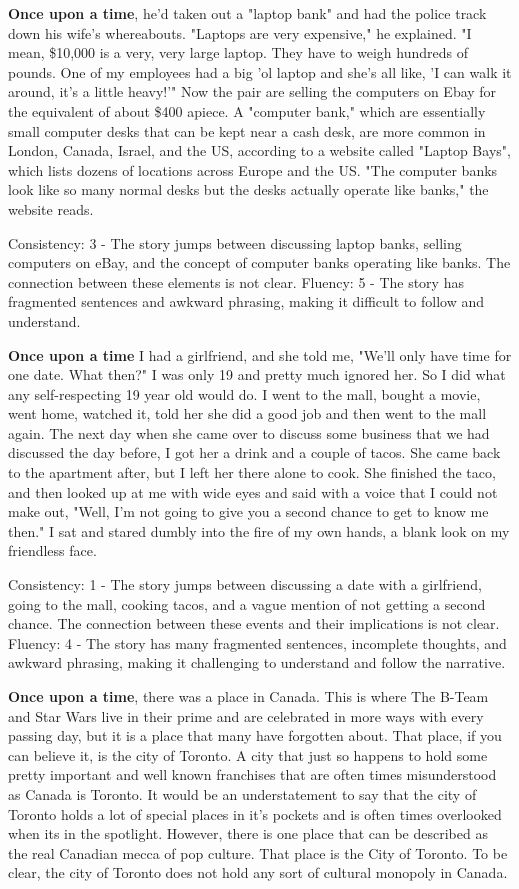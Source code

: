 \documentclass{article}
\begin{document}
\textbf{Once upon a time}, he'd taken out a "laptop bank" and had the police track down his wife's whereabouts. "Laptops are very expensive," he explained. "I mean, \$10,000 is a very, very large laptop. They have to weigh hundreds of pounds. One of my employees had a big 'ol laptop and she's all like, 'I can walk it around, it's a little heavy!'" Now the pair are selling the computers on Ebay for the equivalent of about \$400 apiece. A "computer bank," which are essentially small computer desks that can be kept near a cash desk, are more common in London, Canada, Israel, and the US, according to a website called "Laptop Bays", which lists dozens of locations across Europe and the US. "The computer banks look like so many normal desks but the desks actually operate like banks," the website reads.

Consistency: 3 - The story jumps between discussing laptop banks, selling computers on eBay, and the concept of computer banks operating like banks. The connection between these elements is not clear.
Fluency: 5 - The story has fragmented sentences and awkward phrasing, making it difficult to follow and understand.

\textbf{Once upon a time} I had a girlfriend, and she told me, "We'll only have time for one date. What then?" I was only 19 and pretty much ignored her. So I did what any self-respecting 19 year old would do. I went to the mall, bought a movie, went home, watched it, told her she did a good job and then went to the mall again. The next day when she came over to discuss some business that we had discussed the day before, I got her a drink and a couple of tacos. She came back to the apartment after, but I left her there alone to cook. She finished the taco, and then looked up at me with wide eyes and said with a voice that I could not make out, "Well, I'm not going to give you a second chance to get to know me then." I sat and stared dumbly into the fire of my own hands, a blank look on my friendless face.

Consistency: 1 - The story jumps between discussing a date with a girlfriend, going to the mall, cooking tacos, and a vague mention of not getting a second chance. The connection between these events and their implications is not clear.
Fluency: 4 - The story has many fragmented sentences, incomplete thoughts, and awkward phrasing, making it challenging to understand and follow the narrative.

\textbf{Once upon a time}, there was a place in Canada. This is where The B-Team and Star Wars live in their prime and are celebrated in more ways with every passing day, but it is a place that many have forgotten about. That place, if you can believe it, is the city of Toronto. A city that just so happens to hold some pretty important and well known franchises that are often times misunderstood as Canada is Toronto. It would be an understatement to say that the city of Toronto holds a lot of special places in it's pockets and is often times overlooked when its in the spotlight. However, there is one place that can be described as the real Canadian mecca of pop culture. That place is the City of Toronto. To be clear, the city of Toronto does not hold any sort of cultural monopoly in Canada.
\end{document}
